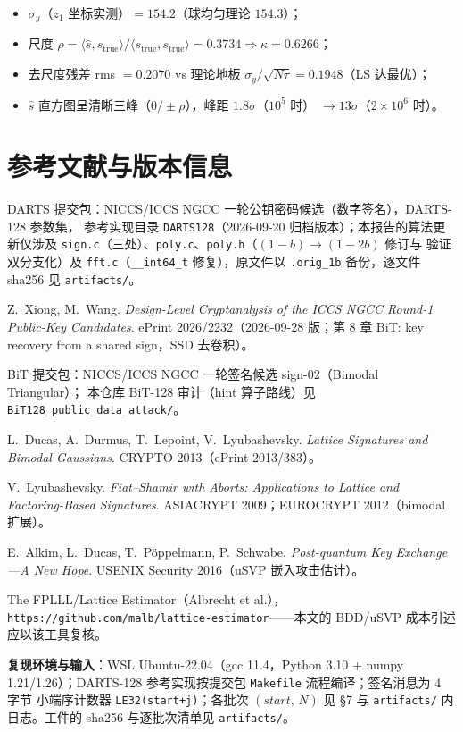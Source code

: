 \documentclass[UTF8,11pt,a4paper]{ctexart}
\newcommand{\code}[1]{\texttt{\small #1}}
\begin{document}
\begin{itemize}
\item $\sigma_y$（$z_1$ 坐标实测）$=154.2$（球均匀理论 $154.3$）；
\item 尺度 $\rho=\langle\hat s,s_{\mathrm{true}}\rangle/\langle s_{\mathrm{true}},s_{\mathrm{true}}\rangle=0.3734
      \Rightarrow \kappa=0.6266$；
\item 去尺度残差 rms $=0.2070$ vs 理论地板 $\sigma_y/\sqrt{N\tau}=0.1948$（LS 达最优）；
\item $\hat s$ 直方图呈清晰三峰（$0/\pm\rho$），峰距 $1.8\sigma$（$10^5$ 时）
      $\to 13\sigma$（$2\times10^6$ 时）。
\end{itemize}

\section*{参考文献与版本信息}

\begin{enumerate}[label={[\arabic*]}]
\item DARTS 提交包：NICCS/ICCS NGCC 一轮公钥密码候选（数字签名），DARTS-128 参数集，
      参考实现目录 \code{DARTS128}（2026-09-20 归档版本）；本报告的算法更新仅涉及
      \code{sign.c}（三处）、\code{poly.c}、\code{poly.h}（$(1-b)\to(1-2b)$ 修订与
      验证双分支化）及 \code{fft.c}（\code{\_\_int64\_t} 修复），原文件以
      \code{*.orig\_1b} 备份，逐文件 sha256 见 \code{artifacts/}。
\item Z.~Xiong, M.~Wang. \emph{Design-Level Cryptanalysis of the ICCS NGCC
      Round-1 Public-Key Candidates}. ePrint 2026/2232（2026-09-28 版；第 8 章
      BiT: key recovery from a shared sign，SSD 去卷积）。
\item BiT 提交包：NICCS/ICCS NGCC 一轮签名候选 sign-02（Bimodal Triangular）；
      本仓库 BiT-128 审计（hint 算子路线）见 \code{BiT128\_public\_data\_attack/}。
\item L.~Ducas, A.~Durmus, T.~Lepoint, V.~Lyubashevsky. \emph{Lattice Signatures
      and Bimodal Gaussians}. CRYPTO 2013（ePrint 2013/383）。
\item V.~Lyubashevsky. \emph{Fiat--Shamir with Aborts: Applications to Lattice and
      Factoring-Based Signatures}. ASIACRYPT 2009；EUROCRYPT 2012（bimodal 扩展）。
\item E.~Alkim, L.~Ducas, T.~Pöppelmann, P.~Schwabe. \emph{Post-quantum Key
      Exchange---A New Hope}. USENIX Security 2016（uSVP 嵌入攻击估计）。
\item The FPLLL/Lattice Estimator（Albrecht et al.），
      \code{https://github.com/malb/lattice-estimator}——本文的 BDD/uSVP 成本引述
      应以该工具复核。
\end{enumerate}

\noindent\textbf{复现环境与输入}：WSL Ubuntu-22.04（gcc 11.4，Python 3.10 + numpy
1.21/1.26）；DARTS-128 参考实现按提交包 \code{Makefile} 流程编译；签名消息为 4 字节
小端序计数器 \code{LE32(start+j)}；各批次 $(start,\,N)$ 见 \S7 与
\code{artifacts/} 内日志。工件的 sha256 与逐批次清单见 \code{artifacts/}。
\end{document}
